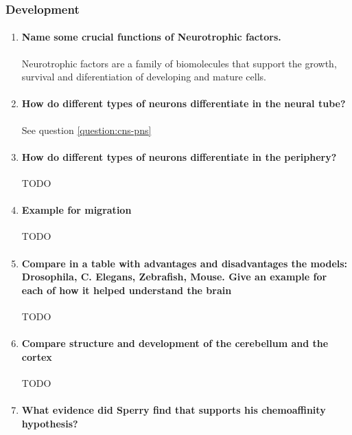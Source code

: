 \documentclass[12pt,article,oneside,a4paper]{memoir}
\begin{document}
\subsubsection{Development}
\begin{enumerate}
\item \paragraph{Name some crucial functions of Neurotrophic factors.}
Neurotrophic factors are a family of biomolecules that support the growth, survival and diferentiation of developing and mature cells.

\item \paragraph{How do different types of neurons differentiate in the neural tube?}
See question \ref{question:cns-pns}

\item \paragraph{How do different types of neurons differentiate in the periphery?}
TODO

\item \paragraph{Example for migration}
TODO

\item \paragraph{Compare in a table with advantages and disadvantages the models: Drosophila, C. Elegans, Zebrafish, Mouse. Give an example for each of how it helped understand the brain}
TODO

\item \paragraph{Compare structure and development of the cerebellum and the cortex}
TODO

\item \paragraph{What evidence did Sperry find that supports his chemoaffinity hypothesis?}


\end{enumerate}
\end{document}
